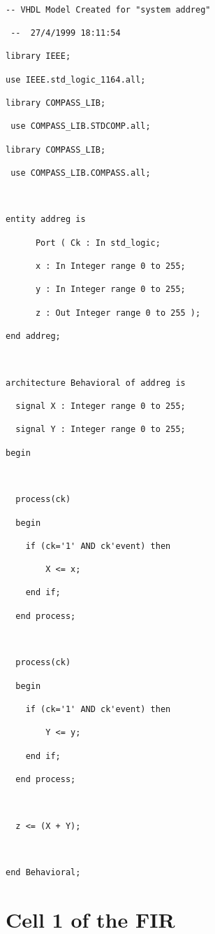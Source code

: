 \begin{verbatim}

-- VHDL Model Created for "system addreg" 

 --  27/4/1999 18:11:54

library IEEE;

use IEEE.std_logic_1164.all;

library COMPASS_LIB;

 use COMPASS_LIB.STDCOMP.all;

library COMPASS_LIB; 

 use COMPASS_LIB.COMPASS.all;

  

entity addreg is

      Port ( Ck : In std_logic;

      x : In Integer range 0 to 255;

      y : In Integer range 0 to 255;

      z : Out Integer range 0 to 255 );

end addreg;



architecture Behavioral of addreg is

  signal X : Integer range 0 to 255;

  signal Y : Integer range 0 to 255;

begin



  process(ck)

  begin

    if (ck='1' AND ck'event) then

        X <= x;

    end if;

  end process;



  process(ck)

  begin

    if (ck='1' AND ck'event) then

        Y <= y;

    end if;

  end process;



  z <= (X + Y);



end Behavioral;

\end{verbatim}



\section{Cell 1 of the FIR}



